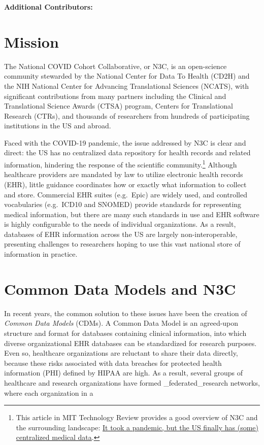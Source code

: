 \documentclass[
  letterpaper,
  DIV=11,
  numbers=noendperiod]{scrreprt}
\begin{document}
\textbf{Additional Contributors:}

\hypertarget{mission}{%
\section{Mission}\label{mission}}

The National COVID Cohort Collaborative, or N3C, is an open-science
community stewarded by the National Center for Data To Health (CD2H) and
the NIH National Center for Advancing Translational Sciences (NCATS),
with significant contributions from many partners including the Clinical
and Translational Science Awards (CTSA) program, Centers for
Translational Research (CTRs), and thousands of researchers from
hundreds of participating institutions in the US and abroad.

Faced with the COVID-19 pandemic, the issue addressed by N3C is clear
and direct: the US has no centralized data repository for health records
and related information, hindering the response of the scientific
community.\footnote{This article in MIT Technology Review provides a
  good overview of N3C and the surrounding landscape:
  \href{https://www.technologyreview.com/2021/06/21/1026590/us-covid-database-n3c-nih-privacy/}{It
  took a pandemic, but the US finally has (some) centralized medical
  data}.} Although healthcare providers are mandated by law to utilize
electronic health records (EHR), little guidance coordinates how or
exactly what information to collect and store. Commercial EHR suites
(e.g.~Epic) are widely used, and controlled vocabularies (e.g.~ICD10 and
SNOMED) provide standards for representing medical information, but
there are many such standards in use and EHR software is highly
configurable to the needs of individual organizations. As a result,
databases of EHR information across the US are largely
non-interoperable, presenting challenges to researchers hoping to use
this vast national store of information in practice.

\hypertarget{common-data-models-and-n3c}{%
\section{Common Data Models and N3C}\label{common-data-models-and-n3c}}

In recent years, the common solution to these issues have been the
creation of \emph{Common Data Models} (CDMs). A Common Data Model is an
agreed-upon structure and format for databases containing clinical
information, into which diverse organizational EHR databases can be
standardized for research purposes. Even so, healthcare organizations
are reluctant to share their data directly, because these risks
associated with data breaches for protected health information (PHI)
defined by HIPAA are high. As a result, several groups of healthcare and
research organizations have formed \_federated\_research networks, where
each organization in a
\end{document}
